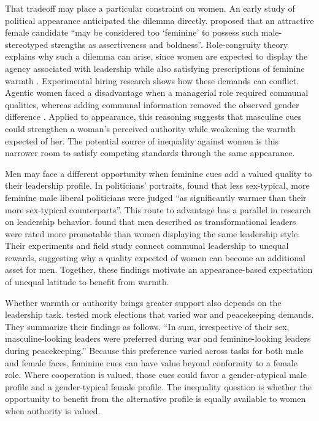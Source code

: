 \documentclass[11pt,a4paper]{article}\usepackage[]{graphicx}\usepackage[]{xcolor}
\begin{document}
That tradeoff may place a particular constraint on women. An early study of political appearance anticipated the dilemma directly. \textcite[33]{Sigelman1987a} proposed that an attractive female candidate ``may be considered too `feminine' to possess such male-stereotyped strengths as assertiveness and boldness''. Role-congruity theory explains why such a dilemma can arise, since women are expected to display the agency associated with leadership while also satisfying prescriptions of feminine warmth \parencite{Eagly2002}. Experimental hiring research shows how these demands can conflict. Agentic women faced a disadvantage when a managerial role required communal qualities, whereas adding communal information removed the observed gender difference \parencite{RudmanGlick2001}. Applied to appearance, this reasoning suggests that masculine cues could strengthen a woman's perceived authority while weakening the warmth expected of her. The potential source of inequality against women is this narrower room to satisfy competing standards through the same appearance.

Men may face a different opportunity when feminine cues add a valued quality to their leadership profile. In politicians' portraits, \textcite[775]{CarpinellaJohnson2013b} found that less sex-typical, more feminine male liberal politicians were judged ``as significantly warmer than their more sex-typical counterparts''. This route to advantage has a parallel in research on leadership behavior. \textcite{Hentschel2018} found that men described as transformational leaders were rated more promotable than women displaying the same leadership style. Their experiments and field study connect communal leadership to unequal rewards, suggesting why a quality expected of women can become an additional asset for men. Together, these findings motivate an appearance-based expectation of unequal latitude to benefit from warmth.

Whether warmth or authority brings greater support also depends on the leadership task. \textcite[5]{SpisakWarriors2012} tested mock elections that varied war and peacekeeping demands. They summarize their findings as follows. ``In sum, irrespective of their sex, masculine-looking leaders were preferred during war and feminine-looking leaders during peacekeeping.'' Because this preference varied across tasks for both male and female faces, feminine cues can have value beyond conformity to a female role. Where cooperation is valued, those cues could favor a gender-atypical male profile and a gender-typical female profile. The inequality question is whether the opportunity to benefit from the alternative profile is equally available to women when authority is valued.
\end{document}
